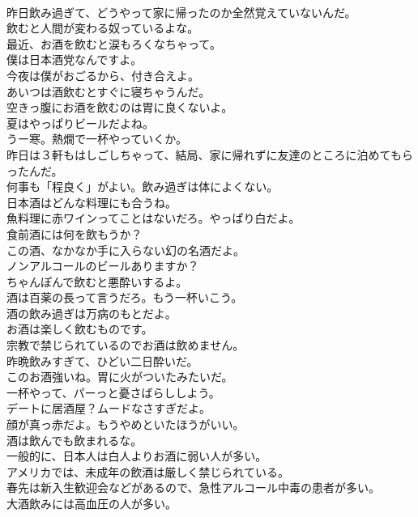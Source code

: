 \documentclass[8pt]{extreport}
\begin{document}
\begin{CJK}{UTF8}{min}
\\	昨日飲み過ぎて、どうやって家に帰ったのか全然覚えていないんだ。	
\\	飲むと人間が変わる奴っているよな。	
\\	最近、お酒を飲むと涙もろくなちゃって。	
\\	僕は日本酒党なんですよ。	
\\	今夜は僕がおごるから、付き合えよ。	
\\	あいつは酒飲むとすぐに寝ちゃうんだ。	
\\	空きっ腹にお酒を飲むのは胃に良くないよ。	
\\	夏はやっぱりビールだよね。	
\\	うー寒。熱燗で一杯やっていくか。	
\\	昨日は３軒もはしごしちゃって、結局、家に帰れずに友達のところに泊めてもらったんだ。	
\\	何事も「程良く」がよい。飲み過ぎは体によくない。	
\\	日本酒はどんな料理にも合うね。	
\\	魚料理に赤ワインってことはないだろ。やっぱり白だよ。	
\\	食前酒には何を飲もうか？	
\\	この酒、なかなか手に入らない幻の名酒だよ。	
\\	ノンアルコールのビールありますか？	
\\	ちゃんぽんで飲むと悪酔いするよ。	
\\	酒は百薬の長って言うだろ。もう一杯いこう。	
\\	酒の飲み過ぎは万病のもとだよ。	
\\	お酒は楽しく飲むものです。	
\\	宗教で禁じられているのでお酒は飲めません。	
\\	昨晩飲みすぎて、ひどい二日酔いだ。	
\\	このお酒強いね。胃に火がついたみたいだ。	
\\	一杯やって、パーっと憂さばらししよう。	
\\	デートに居酒屋？ムードなさすぎだよ。	
\\	顔が真っ赤だよ。もうやめといたほうがいい。	
\\	酒は飲んでも飲まれるな。	
\\	一般的に、日本人は白人よりお酒に弱い人が多い。	
\\	アメリカでは、未成年の飲酒は厳しく禁じられている。	
\\	春先は新入生歓迎会などがあるので、急性アルコール中毒の患者が多い。	
\\	大酒飲みには高血圧の人が多い。	

\end{CJK}
\end{document}
